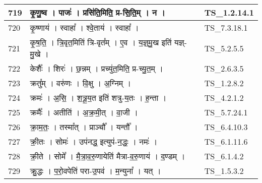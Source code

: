 \documentclass[17pt]{extarticle}
\begin{document}
\begin{longtable}{||p{0.4in}||p{4.9in}||p{0.9in}||}
    719 & कृ॒णु॒ष्व   ।   पाजः॑   ।   प्रसि॑ति॒मिति॒ प्र{-}सि॒ति॒म्   ।   न   ।    & TS\_1.2.14.1       \\
    
    \hline
        
    720 & कृ॒ष्णाय॑   ।   स्वाहा᳚   ।   श्वे॒ताय॑   ।   स्वाहा᳚   ।    & TS\_7.3.18.1       \\
    
    \hline
        
    721 & कृ॒ष॒ति॒   ।   त्रि॒वृत॒मिति॑ त्रि{-}वृत᳚म्   ।   ए॒व   ।   य॒ज्ञ्॒मु॒ख इति॑ यज्ञ्{-}मु॒खे   ।    & TS\_5.2.5.5       \\
    
    \hline
        
    722 & केशैः᳚   ।   शिरः॑   ।   छ॒न्नम्   ।   प्रच्यु॑त॒मिति॒ प्र{-}च्यु॒त॒म्   ।    & TS\_2.6.3.5       \\
    
    \hline
        
    723 & क्रतु᳚म्   ।   वरु॑णः   ।   वि॒क्षु   ।   अ॒ग्निम्   ।    & TS\_1.2.8.2       \\
    
    \hline
        
    724 & क्रमः॑   ।   अ॒सि॒   ।   श॒त्रू॒य॒त इति॑ शत्रु{-}य॒तः   ।   ह॒न्ता   ।    & TS\_4.2.1.2       \\
    
    \hline
        
    725 & क्रमैः᳚   ।   अतीति॑   ।   अ॒क्र॒मी॒त्   ।   वा॒जी   ।    & TS\_5.7.24.1       \\
    
    \hline
        
    726 & क्रा॒म॒तः॒   ।   तस्मा᳚त्   ।   प्राञ्चौ᳚   ।   यन्तौ᳚   ।    & TS\_6.4.10.3       \\
    
    \hline
        
    727 & क्री॒तः   ।   सोमः॑   ।   उप॑नद्ध॒ इत्युप॑{-}न॒द्धः॒   ।   नमः॑   ।    & TS\_6.1.11.6       \\
    
    \hline
        
    728 & क्री॒ते   ।   सोमे᳚   ।   मै॒त्रा॒व॒रु॒णायेति॑ मैत्रा{-}व॒रु॒णाय॑   ।   द॒ण्डम्   ।    & TS\_6.1.4.2       \\
    
    \hline
        
    729 & क्रु॒द्धः   ।   प॒रो॒वपेति॑ परा{-}उ॒पव॑   ।   म॒न्युना᳚   ।   यत्   ।    & TS\_1.5.3.2       \\
    

\end{longtable}
\end{document}
